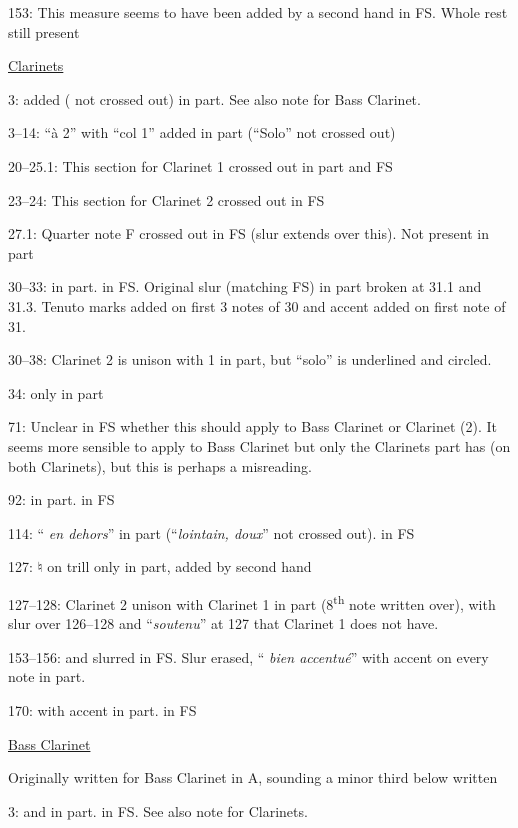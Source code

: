 \documentclass[twoside]{article}
\newcommand\dynmark[1]{\scalebox{0.9}{#1}{\kern1pt}}
\begin{document}
\begin{hangparas}{15pt}{1}
\begin{multicols}{2}
153: This measure seems to have been added by a second hand in FS. Whole rest still present

\underline{Clarinets}

3: \dynmark{\mf} added (\dynmark{\p} not crossed out) in part. See also note for Bass Clarinet.

3--14: ``à 2'' with ``col 1'' added in part (``Solo'' not crossed out)

20--25.1: This section for Clarinet 1 crossed out in part and FS

23--24: This section for Clarinet 2 crossed out in FS

27.1: Quarter note F crossed out in FS (slur extends over this). Not present in part

30--33: \dynmark{\mf} in part. \dynmark{\p} in FS. Original slur (matching FS) in part broken at 31.1 and 31.3. Tenuto marks added on first 3 notes of 30 and accent added on first note of 31.

30--38: Clarinet 2 is unison with 1 in part, but ``solo'' is underlined and circled.

34: \dynmark{\f} only in part

71: Unclear in FS whether this \dynmark{\sF} should apply to Bass Clarinet or Clarinet (2). It seems more sensible to apply to Bass Clarinet but only the Clarinets part has \dynmark{\sF} (on both Clarinets), but this is perhaps a misreading.

92: \dynmark{\mf} in part. \dynmark{\p} in FS

114: ``\dynmark{\mf} \textit{en dehors}'' in part (``\textit{lointain, doux}'' not crossed out). \dynmark{\p} in FS

127: ♮ on trill only in part, added by second hand

127--128: Clarinet 2 unison with Clarinet 1 in part (8\textsuperscript{th} note written over), with slur over 126--128 and ``\textit{soutenu}'' at 127 that Clarinet 1 does not have.

153--156: \dynmark{\p} and slurred in FS. Slur erased, ``\dynmark{\mf} \textit{bien accentué}'' with accent on every note in part.

170: \dynmark{\p} with accent in part. \dynmark{\sF} in FS

\columnbreak

\underline{Bass Clarinet}

Originally written for Bass Clarinet in A, sounding a minor third below written

3: \dynmark{\mf} and \dynmark{\mezzopiano} in part. \dynmark{\p} in FS. See also note for Clarinets.


\end{multicols}
\end{hangparas}
\end{document}
